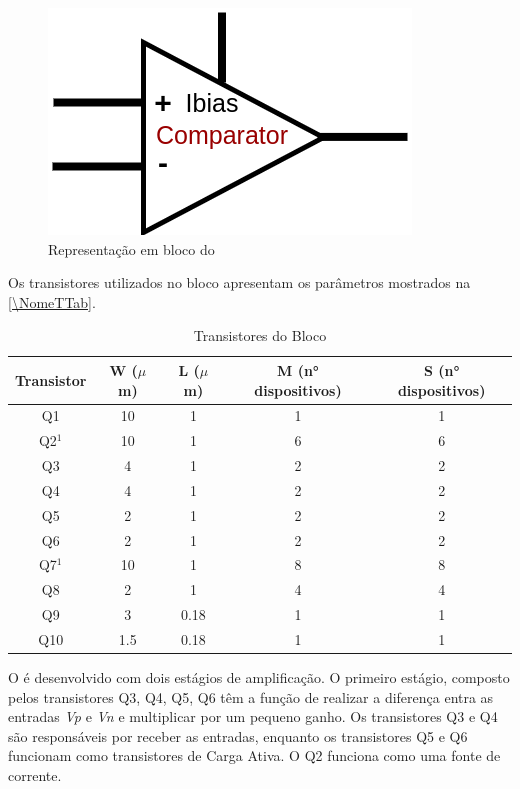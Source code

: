 \begin{figure}[htb]
 \centering
    \centering
    \caption{Representação em bloco do \NomeBloco} \label{\NomeSFig}
    \includegraphics[scale=0.3]{Circuitos/Comparator_block.png}
\end{figure}

Os transistores utilizados no bloco \NomeBloco{} apresentam os par\^ametros mostrados na \autoref{\NomeTTab}.

\begin{table}[htbp]
\caption{Transistores do Bloco \NomeBloco}
\label{\NomeTTab}
\centering
\begin{tabular}{ccccc}
\toprule
Transistor & W ($\mu$m)  & L ($\mu$m)           & M (n° dispositivos) & S (n° dispositivos)\\
\midrule \midrule
Q1 & 10 & 1 & 1 & 1\\
\midrule
Q2$^1$ & 10 & 1 & 6 & 6\\
\midrule
Q3 & 4 & 1 & 2 & 2\\
\midrule
Q4 & 4 & 1 & 2 & 2\\
\midrule
Q5 & 2 & 1 & 2 & 2\\
\midrule
Q6 & 2 & 1 & 2 & 2\\
\midrule
Q7$^1$ & 10 & 1 & 8 & 8\\
\midrule
Q8 & 2 & 1 & 4 & 4\\
\midrule
Q9 & 3 & 0.18 & 1 & 1\\
\midrule
Q10 & 1.5 & 0.18 & 1 & 1\\

\bottomrule
\end{tabular}
\end{table}
 
O \NomeBloco{} \'e desenvolvido com dois est\'agios de amplificação. O primeiro est\'agio, composto pelos transistores Q3, Q4, Q5, Q6 t\^em a função de realizar a diferença entra as entradas \textit{Vp} e \textit{Vn} e multiplicar por um pequeno ganho. Os transistores Q3 e Q4 são respons\'aveis por receber as entradas, enquanto os transistores Q5 e Q6 funcionam como transistores de Carga Ativa. O Q2 funciona como uma fonte de corrente.


